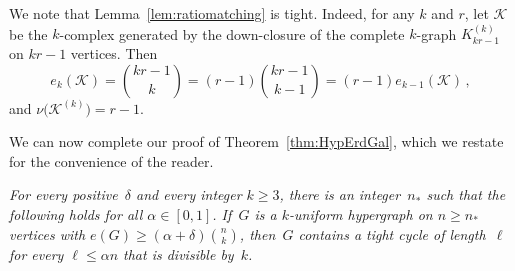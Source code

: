 \documentclass[12pt,a4paper]{amsart}
\newcommand{\K}{\mathcal{K}}
\begin{document}
We note that Lemma~\ref{lem:ratiomatching} is tight. Indeed, for any $k$ and $r$, let $\K$ be the $k$-complex generated by the down-closure of the complete $k$-graph $K^{(k)}_{kr-1}$ on $kr-1$ vertices. Then
\[e_k(\K) = \binom{kr-1}{k} = (r-1)\binom{kr-1}{k-1} = (r-1)e_{k-1}(\K)\,,\]
and $\nu\big(\K^{(k)}\big)=r-1$.

We can now complete our proof of Theorem~\ref{thm:HypErdGal}, which we restate for the convenience of the reader.

\medskip
{}
\emph{For every positive~$\delta$ and every integer $k \ge 3$, there is an
  integer~$n_*$ such that the following holds for all $\alpha\in[0,1]$.
  If~$G$ is a $k$-uniform hypergraph on $n\ge n_*$ vertices with
  $e(G)\ge(\alpha+\delta)\binom{n}{k}$, then~$G$ contains a tight cycle of length~$\ell$ for every
      $\ell\le\alpha n$ that is divisible by~$k$.}
\end{document}
